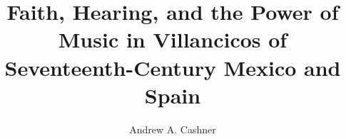 \documentclass{vcbook}
\begin{document}
\title{Faith, Hearing, and the Power of Music in Villancicos of Seventeenth-Century Mexico and Spain}
\author{Andrew A. Cashner}
\maketitle


\end{document}
